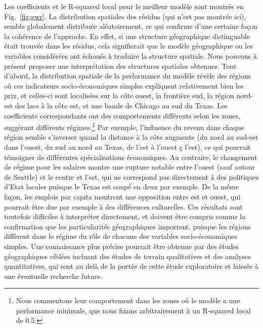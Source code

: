 {Les coefficients et le R-squared local pour le meilleur modèle sont montrés en Fig.~\ref{fig:gwr}. La distribution spatiales des résidus (qui n'est pas montrée ici), semble globalement distribuée aléatoirement, ce qui confirme d'une certaine façon la cohérence de l'approche. En effet, si une structure géographique distinguable était trouvée dans les résidus, cela signifierait que le modèle géographique ou les variables considérées ont échoués à traduire la structure spatiale. Nous pouvons à présent proposer une interprétation des structures spatiales obtenues. Tout d'abord, la distribution spatiale de la performance du modèle révèle des régions où ces indicateurs socio-économiques simples expliquent relativement bien les prix, et celles-ci sont localisées sur la côte ouest, la frontière sud, la région nord-est des lacs à la côte est, et une bande de Chicago au sud du Texas. Les coefficients correspondants ont des comportements différents selon les zones, suggérant différents régimes.\footnote{Nous commentons leur comportement dans les zones où le modèle a une performance minimale, que nous fixons arbitrairement à un R-squared local de 0.5.} Par exemple, l'influence du revenu dans chaque région semble s'inverser quand la distance à la côte augmente (du nord au sud-est dans l'ouest, du sud au nord au Texas, de l'est à l'ouest ç l'est), ce qui pourrait témoigner de différentes spécialisations économiques. Au contraire, le changement de régime pour les salaires montre une rupture notable entre l'ouest (sauf autour de Seattle) et le centre et l'est, qui ne correspond pas directement à des politiques d'Etat locales puisque le Texas est coupé en deux par exemple. De la même façon, les emplois par capita montrent une opposition entre est et ouest, qui pourrait être due par exemple à des différences culturelles. Ces résultats sont toutefois difficiles à interpréter directement, et doivent être compris comme la confirmation que les particularités géographiques importent, puisque les régions diffèrent dans le régime du rôle de chacune des variables socio-économiques simples. Une connaissance plus précise pourrait être obtenue par des études géographiques ciblées incluant des études de terrain qualitatives et des analyses quantitatives, qui sont au delà de la portée de cette étude exploratoire et laissée à une éventuelle recherche future.
}


